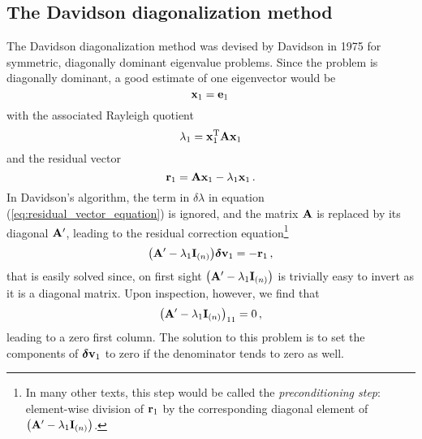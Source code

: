 \subsection{The Davidson diagonalization method}
    The Davidson diagonalization method was devised by Davidson in 1975 \cite{davidson1975} for symmetric, diagonally dominant eigenvalue problems. Since the problem is diagonally dominant, a good estimate of one eigenvector would be
    \begin{equation}
        \vb{x}_1 = \vb{e}_1 \thinspace
    \end{equation}
    with the associated Rayleigh quotient
    \begin{equation}
        \lambda_1 = \vb{x}_1^\text{T} \vb{A} \vb{x}_1
    \end{equation}
    and the residual vector
    \begin{equation}
        \vb{r}_1 = \vb{A} \vb{x}_1 - \lambda_1 \vb{x}_1 \thinspace .
    \end{equation}
    In Davidson's algorithm, the term in $\delta\lambda$ in equation (\ref{eq:residual_vector_equation}) is ignored, and the matrix $\vb{A}$ is replaced by its diagonal $\vb{A}'$, leading to the residual correction equation\footnote{In many other texts, this step would be called the \emph{preconditioning step}: element-wise division of $\vb{r}_1$ by the corresponding diagonal element of $\qty(\vb{A}' - \lambda_1 \vb{I}_{(n)})$.}
    \begin{equation}
        \qty(\vb{A}' - \lambda_1 \vb{I}_{(n)}) \boldsymbol{\delta} \vb{v}_1 = - \vb{r}_1 \thinspace ,
    \end{equation}
    that is easily solved since, on first sight $\qty(\vb{A}' - \lambda_1 \vb{I}_{(n)})$ is trivially easy to invert as it is a diagonal matrix. Upon inspection, however, we find that
    \begin{equation}
        \qty(\vb{A}' - \lambda_1 \vb{I}_{(n)})_{11} = 0 \thinspace ,
    \end{equation}
    leading to a zero first column. The solution to this problem is to set the components of $\boldsymbol{\delta} \vb{v}_1$ to zero if the denominator tends to zero as well.\\

